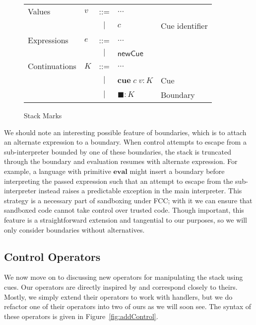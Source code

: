 \documentclass[11pt]{article}
\newcommand{\newhandler}{\textsf{newCue}}
\begin{document}
\begin{figure}[h!]
\caption{Stack Marks}
\label{fig:addCues}

\begin{tabular}{llcll}
Values & $v$ & ::= & $\ldots$ \\
& & $|$ & $c$ & Cue identifier \\
Expressions & $e$ & ::= & $\ldots$ \\
& & $|$ & $\newhandler$ \\
Continuations & $K$ & ::= & $\ldots$ \\
& & $|$ & $\textbf{cue}\;c\;v:K$ & Cue \\
& & $|$ & $\blacksquare:K$ & Boundary \\
\end{tabular}
\end{figure}

We should note an interesting possible feature of boundaries, which is to attach an alternate expression to a boundary.
When control attempts to escape from a sub-interpreter bounded by one of these boundaries, the stack is truncated through the boundary and evaluation resumes with alternate expression.
For example, a language with primitive $\mathbf{eval}$ might insert a boundary before interpreting the passed expression such that an attempt to escape from the sub-interpreter instead raises a predictable exception in the main interpreter.
This strategy is a necessary part of sandboxing under FCC; with it we can ensure that sandboxed code cannot take control over trusted code.\cite{addDelimControlProduction}
Though important, this feature is a straightforward extension and tangential to our purposes, so we will only consider boundaries without alternatives.

\subsection{Control Operators}

We now move on to discussing new operators for manipulating the stack using cues.
Our operators are directly inspired by \cite{MFDC} and correspond closely to theirs.
Mostly, we simply extend their operators to work with handlers, but we do refactor one of their operators into two of ours as we will soon see.
The syntax of these operators is given in Figure~\ref{fig:addControl}.
\end{document}
